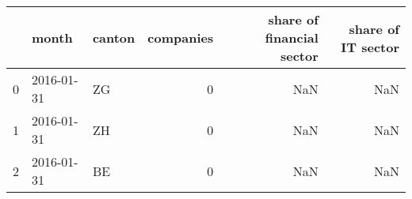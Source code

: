 \begin{tabular}{lllrrr}
\toprule
{} &      month & canton &  companies &  share of financial sector &  share of IT sector \\
\midrule
0 & 2016-01-31 &     ZG &          0 &                        NaN &                 NaN \\
1 & 2016-01-31 &     ZH &          0 &                        NaN &                 NaN \\
2 & 2016-01-31 &     BE &          0 &                        NaN &                 NaN \\
\bottomrule
\end{tabular}
